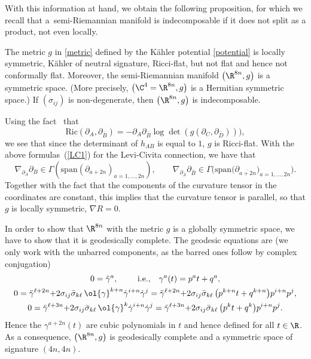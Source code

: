 With this information at hand, we obtain the following proposition, for which we recall
that a~semi-Riemannian manifold is indecomposable if it does not split as a product, not even locally.

\begin{Proposition}\label{kaehlerprop}
The metric $g$ in \eqref{metric} defined by the K\"{a}hler potential \eqref{potential} is locally symmetric, K\"{a}hler of neutral signature, Ricci-flat, but not flat and hence not conformally flat. Moreover, the semi-Riemannian manifold $\bigl(\R^{8n},g\bigr)$ is a symmetric space.
\big(More precisely, $\bigl(\C^4=\R^{8n},g\bigr)$ is a Hermitian symmetric space.\big) If $(\sigma_{ij})$ is non-degenerate, then
$\bigl(\R^{8n},g\bigr)$ is indecomposable.
\end{Proposition}

\bprf
Using the fact~\cite[p.~90]{Moroianu07} that
\[ \mathrm{Ric}(\partial_A,\partial_{\bar B}) = -\partial_A\partial_{\bar B}\log \det (g(\partial_C,\partial_{\bar D}))),\]
we see that since the determinant of $h_{AB}$ is equal to $1$, $g$ is Ricci-flat.
With the above formulas~(\ref{LC1}) for the Levi-Civita connection, we have that
\begin{equation*}
\nabla_{\partial_A}\partial_B \in \Gamma (\mathrm{span} (\partial_{a+2n})_{a=1,\ldots, 2n}),\qquad \nabla_{\partial_{\bar{A}}}\partial_{\bar{B}} \in \Gamma \bigl(\mathrm{span} \bigl(\partial_{\overline{a+2n}}\bigr)_{a=1,\ldots, 2n}\bigr).\end{equation*}
Together with the fact that the components of the curvature tensor in the coordinates are constant, this implies that the curvature tensor is parallel, so that $g$ is locally symmetric,
$\nabla R=0$.

In order to show that $\R^{8n}$ with the metric $g$ is a globally symmetric space, we have to show that it is geodesically complete.
The geodesic equations are (we only work with the unbarred components, as the barred ones follow by complex conjugation)
\begin{gather*}
0 = \ddot{\gamma}^{a},\qquad\text{ i.e.,}\quad \gamma^a(t)=p^at+q^a,
\\
0 =
 \ddot{\gamma}^{\ell+2n} {+2}
 \sigma_{ij}\bar{\sigma}_{k\ell}\,
\ol{\gamma}^{k+n} \dot\gamma^{i+n}{\dot\gamma^{j}}
=
\ddot{\gamma}^{\ell+2n} {+2}
 \sigma_{ij}\bar{\sigma}_{k\ell}\,
\bigl(p^{k+n} t+q^{k+n}\bigr)
{p^{i+n}p^{j}},
\\
0 =
 \ddot{\gamma}^{\ell+3n} {+2}
 \sigma_{ij}\bar{\sigma}_{k\ell}\,
\ol{\gamma}^{k} \dot\gamma^{i+n}{\dot\gamma^{j}}
=
 \ddot{\gamma}^{\ell+3n} {+2}
 \sigma_{ij}\bar{\sigma}_{k\ell}\,
\bigl(p^{k} t+q^{k}\bigr){p^{i+n}p^{j}}.
\end{gather*}
Hence the $\gamma^{a+2n}(t) $ are cubic polynomials in $t$ and hence
 defined for all $t\in \R$.
As a consequence, $\bigl(\R^{8n},g\bigr)$ is geodesically complete and a symmetric space of signature $(4n,4n)$.

